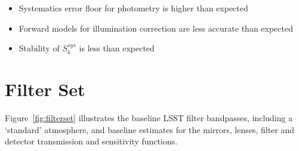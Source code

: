 \documentclass[12pt,preprint]{aastex}
\begin{document}
\begin{itemize}
\item Systematics error floor for photometry is higher than expected
\item Forward models for illumination correction are less accurate than expected
\item Stability of $S_b^{sys}$ is less than expected
\end{itemize}





\appendix

\newpage
\section{Filter Set}

Figure~\ref{fig:filterset} illustrates the baseline LSST filter
bandpasses, including a `standard' atmosphere, and baseline estimates
for the mirrors, lenses, filter and detector transmission and
sensitivity functions. 

\begin{figure}[h!]
\centering
\centering
{}
\end{figure}
\end{document}
